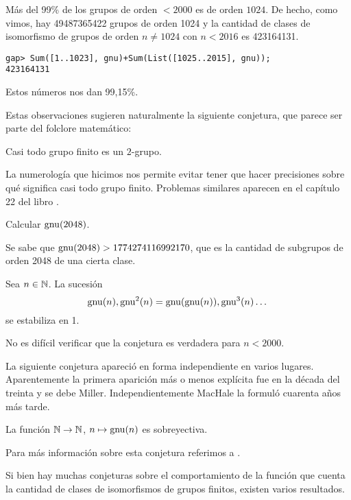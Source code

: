Más del 99\% de los grupos de orden $<2000$ es de orden $1024$. 
De hecho, como vimos, hay 49487365422 grupos de orden 1024 y la cantidad de clases de isomorfismo 
de grupos de orden $n\ne1024$ con $n<2016$ es 423164131. 

\begin{lstlisting}
gap> Sum([1..1023], gnu)+Sum(List([1025..2015], gnu));
423164131
\end{lstlisting}

Estos números nos dan 99,15\%. 

Estas observaciones sugieren naturalmente la siguiente conjetura,
que parece ser parte del folclore matemático:

\begin{conjecture}
Casi todo grupo finito es un $2$-grupo. 
\end{conjecture}

La numerología que hicimos nos permite evitar tener que hacer precisiones sobre 
qué significa \guillemotleft casi todo grupo finito\guillemotright. Problemas
similares aparecen en el capítulo 22 del libro \cite[]{MR2382539}.

\begin{problem}
Calcular $\operatorname{gnu}(2048)$. 
\end{problem}

Se sabe que $\operatorname{gnu}(2048)>1774274116992170$, que es la cantidad de subgrupos de orden 2048 
de una cierta clase. 

\begin{conjecture}
Sea $n\in\mathbb{N}$. La sucesión
\[
\operatorname{gnu}(n),\operatorname{gnu}^2(n)=\operatorname{gnu}(\operatorname{gnu}(n)),\operatorname{gnu}^3(n)\dots
\]
se estabiliza en 1. 
\end{conjecture}

No es difícil verificar que la conjetura es verdadera para $n<2000$.

La siguiente conjetura apareció en forma independiente en varios lugares. 
Aparentemente la primera aparición más o menos explícita 
fue en la década del treinta y se debe Miller. 
Independientemente MacHale la formuló cuarenta años más tarde. 

\begin{conjecture}
La función $\mathbb{N}\to\mathbb{N}$, $n\mapsto\operatorname{gnu}(n)$ es sobreyectiva. 
\end{conjecture}

Para más información sobre esta conjetura referimos a \cite[\S21.6]{MR2382539}.

Si bien hay muchas conjeturas sobre el comportamiento de la función que cuenta la cantidad de 
clases de isomorfismos de grupos finitos, existen varios 
resultados. 

